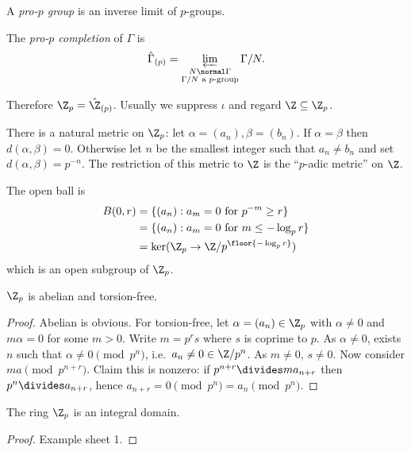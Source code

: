 \documentclass[a4paper]{article}
\begin{document}
\begin{definition}
  A \emph{pro-\(p\) group} is an inverse limit of \(p\)-groups.

  The \emph{pro-\(p\) completion} of \(\Gamma\) is
  \[
    \hat \Gamma_{(p)} = \varprojlim_{\substack{N \normal \Gamma \\ \Gamma/N \text{ a \(p\)-group}}} \Gamma/N.
  \]
\end{definition}

Therefore \(\Z_p = \hat \Z_{(p)}\). Usually we suppress \(\iota\) and regard \(\Z \subseteq \Z_p\).

There is a natural metric on \(\Z_p\): let \(\alpha = (a_n), \beta = (b_n)\). If \(\alpha = \beta\) then \(d(\alpha, \beta) = 0\). Otherwise let \(n\) be the smallest integer such that \(a_n \ne b_n\) and set \(d(\alpha, \beta) = p^{-n}\). The restriction of this metric to \(\Z\) is the ``\(p\)-adic metric'' on \(\Z\).

The open ball is
\begin{align*}
  B(0, r)
  &= \{(a_n): a_m = 0 \text{ for } p^{-m} \geq r\} \\
  &= \{(a_n): a_m = 0 \text{ for } m \leq -\log_p r\} \\
  &= \ker(\Z_p \to \Z/p^{\floor{-\log_p r}})
\end{align*}
which is an open subgroup of \(\Z_p\).

\begin{proposition}
  \(\Z_p\) is abelian and torsion-free.
\end{proposition}

\begin{proof}
  Abelian is obvious. For torsion-free, let \(\alpha = (a_n) \in \Z_p\) with \(\alpha \ne 0\) and \(m\alpha = 0\) for some \(m > 0\). Write \(m = p^rs\) where \(s\) is coprime to \(p\). As \(\alpha \ne 0\), exists \(n\) such that \(\alpha \ne 0 \pmod{p^n}\), i.e.\ \(a_n \ne 0 \in \Z/p^n\). As \(m \ne 0\), \(s \ne 0\). Now consider \(ma \pmod{p^{n + r}}\). Claim this is nonzero: if \(p^{n + r} \divides ma_{n + r}\) then \(p^n \divides  a_{n + r}\), hence \(a_{n + r} = 0 \pmod{p^n} = a_n \pmod{p^n}\).
\end{proof}

\begin{proposition}
  The ring \(\Z_p\) is an integral domain.
\end{proposition}

\begin{proof}
  Example sheet 1.
\end{proof}
\end{document}

